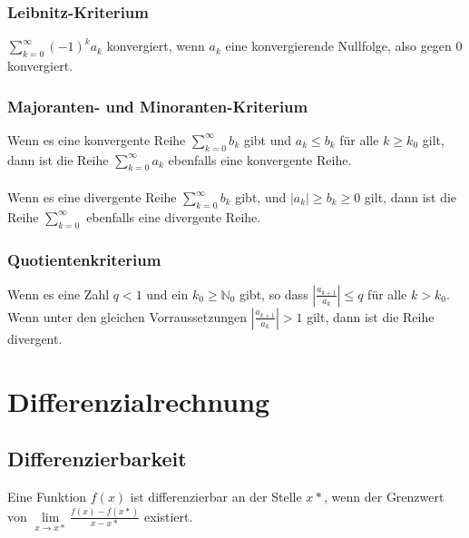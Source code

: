 \documentclass[a4paper,landscape, 11pt]{article}
\newcommand{\limFromTo}[2]{ \lim\limits_{#2 \rightarrow #1}}
\begin{document}
\begin{multicols}{4}
\begin{small}
            \subsubsection{Leibnitz-Kriterium}
                $\sum_{k=0}^{\infty} (-1)^k a_k$ konvergiert, wenn $a_k$ eine konvergierende Nullfolge, also gegen 0 konvergiert.        
            \subsubsection{Majoranten- und Minoranten-Kriterium}
                Wenn es eine konvergente Reihe $\sum_{k=0}^{\infty}b_k$ gibt und $a_k \le b_k$ für alle $k \ge k_0$ gilt, dann ist die Reihe $\sum_{k=0}^{\infty}a_k$ ebenfalls eine konvergente Reihe.
                \\ \\
                Wenn es eine divergente Reihe $\sum_{k=0}^{\infty}b_k$ gibt,  und $|a_k| \ge b_k \ge 0$ gilt, dann ist die Reihe $\sum_{k=0}^{\infty}$ ebenfalls eine divergente Reihe.
            \subsubsection{Quotientenkriterium}
                Wenn es eine Zahl $q < 1$ und ein $k_0 \ge \mathbb{N}_0$ gibt, so dass $\left|\frac{a_{k+1}}{a_k} \right| \le q$ für alle $k > k_0.$ \\
                Wenn unter den gleichen Vorraussetzungen $\left|\frac{a_{k+1}}{a_k} \right| > 1$ gilt, dann ist die Reihe divergent.
    \section{Differenzialrechnung}
    	\subsection{Differenzierbarkeit}
                  Eine Funktion $f(x)$ ist differenzierbar an der Stelle $x*$, wenn der Grenzwert von $\limFromTo{x*}{x} \frac{f(x) - f(x*)}{x - x*}$ existiert. 
                  \\ \\

\end{small}
\end{multicols}
\end{document}
